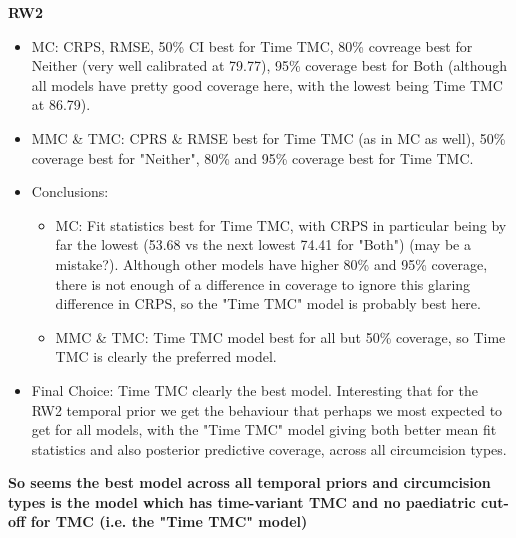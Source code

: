 \documentclass{article}
\begin{document}
\textbf{RW2}
\begin{itemize}
    \item MC: CRPS, RMSE, 50\% CI best for Time TMC, 80\% covreage best for Neither (very well calibrated at 79.77), 95\% coverage best for Both (although all models have pretty good coverage here, with the lowest being Time TMC at 86.79). 
    \item MMC \& TMC: CPRS \& RMSE best for Time TMC (as in MC as well), 50\% coverage best for "Neither", 80\% and 95\% coverage best for Time TMC.
    \item Conclusions:
      \begin{itemize}
          \item MC: Fit statistics best for Time TMC, with CRPS in particular being by far the lowest (53.68 vs the next lowest 74.41 for "Both") (may be a mistake?). Although other models have higher 80\% and 95\% coverage, there is not enough of a difference in coverage to ignore this glaring difference in CRPS, so the "Time TMC" model is probably best here. 
          \item MMC \& TMC: Time TMC model best for all but 50\% coverage, so Time TMC is clearly the preferred model.
      \end{itemize}
    \item Final Choice: Time TMC clearly the best model. Interesting that for the RW2 temporal prior we get the behaviour that perhaps we most expected to get for all models, with the "Time TMC" model giving both better mean fit statistics and also posterior predictive coverage, across all circumcision types. 
\end{itemize}

\vspace{\bigskipamount}
    
\textbf{So seems the best model across all temporal priors and circumcision types is the model which has time-variant TMC and no paediatric cut-off for TMC (i.e. the "Time TMC" model)}

\vspace{\bigskipamount}
\end{document}
